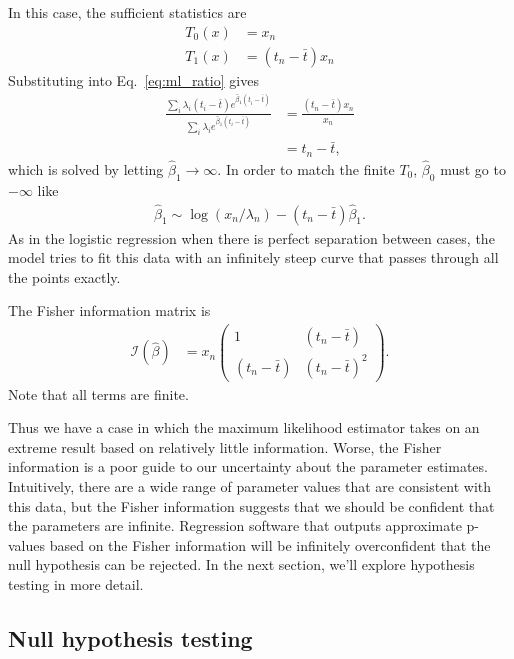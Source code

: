 \documentclass[12pt, letterpaper]{article}
\begin{document}
In this case, the sufficient statistics are
\begin{align}
    T_0(x) &= x_n \\
    T_1(x) &= (t_n - \bar{t}) x_n
\end{align}
Substituting into Eq.~\ref{eq:ml_ratio} gives
\begin{align}
    \frac
        {\sum_i \lambda_i (t_i - \bar{t}) e^{\hat{\beta}_1(t_i - \bar{t})}}
        {\sum_i \lambda_i e^{\hat{\beta}_1(t_i - \bar{t})}}
    & = \frac{(t_n - \bar{t}) x_n}{x_n} \\
    & = t_n - \bar{t},
\end{align}
which is solved by letting $\hat{\beta}_1 \to \infty$.
In order to match the finite $T_0$, $\hat{\beta}_0$ must go to $-\infty$ like
\begin{align}
    \hat{\beta}_1 \sim \log(x_n / \lambda_n) - (t_n - \bar{t})\hat{\beta}_1.
    \label{eq:ec_scaling}
\end{align}
As in the logistic regression when there is perfect separation between cases, the model tries to fit this data with an infinitely steep curve that passes through all the points exactly.

The Fisher information matrix is
\begin{align}
    \mathcal{I}(\hat{\beta}) &= x_n
    \begin{pmatrix}
        1 & (t_n - \bar{t}) \\
        (t_n - \bar{t}) & {(t_n - \bar{t})}^2
    \end{pmatrix}.
\end{align}
Note that all terms are finite.

Thus we have a case in which the maximum likelihood estimator takes on an extreme result based on relatively little information.
Worse, the Fisher information is a poor guide to our uncertainty about the parameter estimates.
Intuitively, there are a wide range of parameter values that are consistent with this data, but the Fisher information suggests that we should be confident that the parameters are infinite.
Regression software that outputs approximate p-values based on the Fisher information will be infinitely overconfident that the null hypothesis can be rejected.
In the next section, we'll explore hypothesis testing in more detail.

\subsection{Null hypothesis testing}
\end{document}
